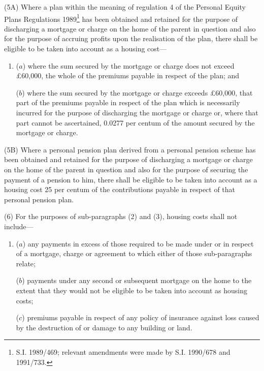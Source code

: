 \documentclass[12pt,a4paper]{article}
\begin{document}
(5A) Where a plan within the meaning of regulation 4 of the Personal Equity Plans Regulations 1989\footnote{\frenchspacing S.I. 1989/469; relevant amendments were made by S.I. 1990/678 and 1991/733.} has been obtained and retained for the purpose of discharging a mortgage or charge on the home of the parent in question and also for the purpose of accruing profits upon the realisation of the plan, there shall be eligible to be taken into account as a housing cost—
\begin{enumerate}\item[]
($a$) where the sum secured by the mortgage or charge does not exceed £60,000, the whole of the premiums payable in respect of the plan; and

($b$) where the sum secured by the mortgage or charge exceeds £60,000, that part of the premiums payable in respect of the plan which is necessarily incurred for the purpose of discharging the mortgage or charge or, where that part cannot be ascertained, 0.0277 per centum of the amount secured by the mortgage or charge.
\end{enumerate}

(5B) Where a personal pension plan 
derived from a personal pension scheme  %
has been obtained and retained for the purpose of discharging a mortgage or charge on the home of the parent in question and also for the purpose of securing the payment of a pension to him, there shall be eligible to be taken into account as a housing cost 25 per centum of the contributions payable in respect of that personal pension plan.

(6) For the purposes of sub-paragraphs (2) and (3), housing costs shall not include—
\begin{enumerate}\item[]
($a$) 
any payments in excess of those required  %
to be made under or in respect of a mortgage, charge or agreement to which either of those sub-paragraphs relate;

($b$) payments under any second or subsequent mortgage on the home to the extent that 
they would not be eligible  %
to be taken into account as housing costs;

($c$) premiums payable in respect of any policy of insurance against loss caused by the destruction of or damage to any building or land.
\end{enumerate}
\end{document}
